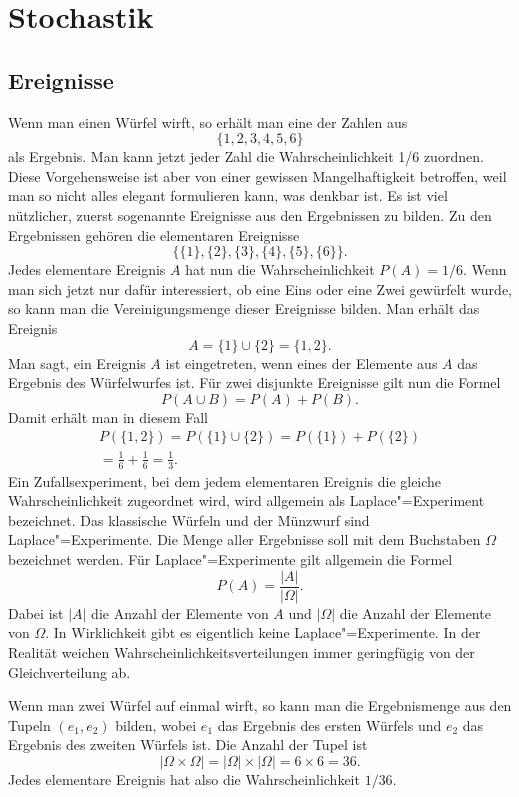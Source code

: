 \documentclass[a4paper,10pt,fleqn,twocolumn,twoside]{article}
\begin{document}
\newpage
\section{Stochastik}
\subsection{Ereignisse}

Wenn man einen Würfel wirft, so erhält man eine der Zahlen aus
\[\{1,2,3,4,5,6\}\]
als Ergebnis. Man kann jetzt jeder Zahl die Wahrscheinlichkeit 1/6
zuordnen. Diese Vorgehensweise ist aber von einer gewissen
Mangelhaftigkeit betroffen, weil man so nicht alles elegant
formulieren kann, was denkbar ist. Es ist viel nützlicher, zuerst
sogenannte Ereignisse aus den Ergebnissen zu bilden. Zu den
Ergebnissen gehören die elementaren Ereignisse
\[\{\{1\},\{2\},\{3\},\{4\},\{5\},\{6\}\}.\]
Jedes elementare Ereignis \(A\) hat nun die Wahrscheinlichkeit
\(P(A)=1/6\). Wenn man sich jetzt nur dafür interessiert, ob eine
Eins oder eine Zwei gewürfelt wurde, so kann man die Vereinigungsmenge
dieser Ereignisse bilden. Man erhält das Ereignis
\[A = \{1\}\cup\{2\} = \{1,2\}.\]
Man sagt, ein Ereignis \(A\) ist eingetreten, wenn eines der Elemente
aus \(A\) das Ergebnis des Würfelwurfes ist. Für zwei disjunkte
Ereignisse gilt nun die Formel
\[P(A\cup B) = P(A)+P(B).\]
Damit erhält man in diesem Fall
\begin{gather*}
P(\{1,2\})=P(\{1\}\cup\{2\})=P(\{1\})+P(\{2\})\\
= \frac{1}{6}+\frac{1}{6} = \frac{1}{3}.
\end{gather*}
Ein Zufallsexperiment, bei dem jedem elementaren Ereignis die
gleiche Wahrscheinlichkeit zugeordnet wird, wird allgemein als
Laplace"=Experiment bezeichnet. Das klassische Würfeln und der
Münzwurf sind Laplace"=Experimente. Die Menge aller Ergebnisse
soll mit dem Buchstaben \(\Omega\) bezeichnet werden.
Für Laplace"=Experimente gilt allgemein die Formel
\[P(A) = \frac{|A|}{|\Omega|}.\]
Dabei ist \(|A|\) die Anzahl der Elemente von \(A\) und \(|\Omega|\)
die Anzahl der Elemente von \(\Omega\). In Wirklichkeit gibt es
eigentlich keine Laplace"=Experimente. In der Realität weichen
Wahrscheinlichkeitsverteilungen immer geringfügig von der
Gleichverteilung ab.

Wenn man zwei Würfel auf einmal wirft, so kann man die Ergebnismenge
aus den Tupeln \((e_1,e_2)\) bilden, wobei \(e_1\) das Ergebnis des
ersten Würfels und \(e_2\) das Ergebnis des zweiten Würfels ist.
Die Anzahl der Tupel ist
\[|\Omega\times\Omega| = |\Omega|\times|\Omega| = 6\times 6 = 36.\]
Jedes elementare Ereignis hat also die Wahrscheinlichkeit \(1/36\).
\end{document}
